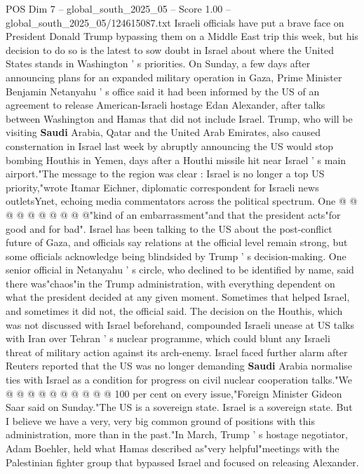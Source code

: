 \begin{textsample}{POS Dim 7 – global\_south\_2025\_05 – Score 1.00 – global\_south\_2025\_05/124615087.txt}  \label{ex:f7_pos_235}
Israeli officials have put a brave face on President Donald Trump bypassing them on a Middle East trip this week, but his decision to do so is the latest to sow doubt in Israel about where the United States stands in Washington ' s priorities.
On Sunday, a few days after announcing plans for an expanded military operation in Gaza, Prime Minister Benjamin Netanyahu ' s office said it had been informed by the US of an agreement to release American-Israeli hostage Edan Alexander, after talks between Washington and Hamas that did not include Israel.
Trump, who will be visiting \textbf{Saudi} Arabia, Qatar and the United Arab Emirates, also caused consternation in Israel last week by abruptly announcing the US would stop bombing Houthis in Yemen, days after a Houthi missile hit near Israel ' s main airport."The message to the region was clear : Israel is no longer a top US priority,"wrote Itamar Eichner, diplomatic correspondent for Israeli news outletsYnet, echoing media commentators across the political spectrum.
One @ @ @ @ @ @ @ @ @ @"kind of an embarrassment"and that the president acts"for good and for bad".
Israel has been talking to the US about the post-conflict future of Gaza, and officials say relations at the official level remain strong, but some officials acknowledge being blindsided by Trump ' s decision-making.
One senior official in Netanyahu ' s circle, who declined to be identified by name, said there was"chaos"in the Trump administration, with everything dependent on what the president decided at any given moment.
Sometimes that helped Israel, and sometimes it did not, the official said.
The decision on the Houthis, which was not discussed with Israel beforehand, compounded Israeli unease at US talks with Iran over Tehran ' s nuclear programme, which could blunt any Israeli threat of military action against its arch-enemy.
Israel faced further alarm after Reuters reported that the US was no longer demanding \textbf{Saudi} Arabia normalise ties with Israel as a condition for progress on civil nuclear cooperation talks."We @ @ @ @ @ @ @ @ @ @ 100 per cent on every issue,"Foreign Minister Gideon Saar said on Sunday."The US is a sovereign state.
Israel is a sovereign state.
But I believe we have a very, very big common ground of positions with this administration, more than in the past."In March, Trump ' s hostage negotiator, Adam Boehler, held what Hamas described as"very helpful"meetings with the Palestinian fighter group that bypassed Israel and focused on releasing Alexander.

\end{textsample}
